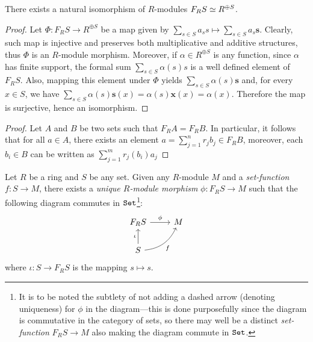 \begin{proposition}
    \label{prop:free-module-structure-isomorphism}
    There exists a natural isomorphism of \(R\)-modules \(F_R S \simeq R^{\oplus S}\).
\end{proposition}

\begin{proof}
    Let \(\Phi: F_R S \to R^{\oplus S}\) be a map given by
    \(\sum_{s \in S} a_s s \mapsto \sum_{s \in S} a_s \mathbf{s}\). Clearly, such
    map is injective and preserves both multiplicative and additive structures, thus
    \(\Phi\) is an \(R\)-module morphism. Moreover, if \(\alpha \in R^{\oplus S}\)
    is any function, since \(\alpha\) has finite support, the formal sum
    \(\sum_{s \in S} \alpha(s) s\) is a well defined element of \(F_R S\). Also,
    mapping this element under \(\Phi\) yields
    \(\sum_{s \in S} \alpha(s) \mathbf{s}\) and, for every \(x \in S\), we have
    \(\sum_{s \in S} \alpha(s) \mathbf{s}(x) = \alpha(s) \mathbf{x}(x) =
    \alpha(x)\). Therefore the map is surjective, hence an isomorphism.
\end{proof}

\begin{proof}
    Let \(A\) and \(B\) be two sets such that \(F_R A = F_R B\). In particular, it
    follows that for all \(a \in A\), there exists an element \(a = \sum_{j=1}^n r_j
    b_j \in F_R B\), moreover, each \(b_i \in B\) can be written as \(\sum_{j=1}^m
    r_j(b_i) a_j\)
\end{proof}

\begin{proposition}
    \label{prop:free-mod-univ-prop}
    Let \(R\) be a ring and \(S\) be any set. Given any \(R\)-module \(M\) and a
    \emph{set-function} \(f: S \to M\), there exists a \emph{unique \(R\)-module
        morphism} \(\phi: F_R S \to M\) such that the following diagram commutes in
    \({\texttt{Set}}\)\footnote{It is to be noted the subtlety of not adding a dashed arrow
        (denoting uniqueness) for \(\phi\) in the diagram---this is done purposefully
        since the diagram is commutative in the category of sets, so there may well be
        a distinct \emph{set-function} \(F_R S \to M\) also making the diagram commute
        in \({\texttt{Set}}\).}:
    \[
        \begin{tikzcd}
            F_R S \ar[r, "\phi"] &M \\
            S \ar[u, "\iota"] \ar[ru, "f"', bend right] &
        \end{tikzcd}
    \]
    where \(\iota: S \to F_R S\) is the mapping \(s \mapsto s\).
\end{proposition}

